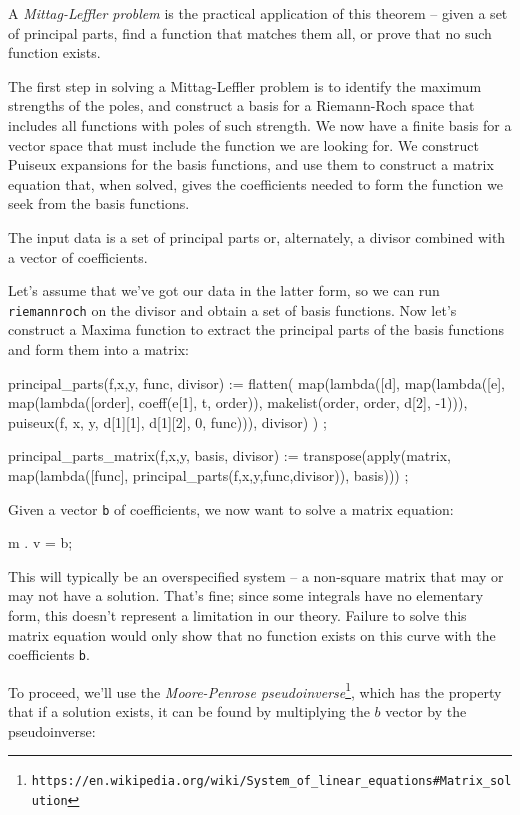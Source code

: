 A {\it Mittag-Leffler problem} is the practical application of this
theorem -- given a set of principal parts, find a function that
matches them all, or prove that no such function exists.

The first step in solving a Mittag-Leffler problem is to identify the
maximum strengths of the poles, and construct a basis for a
Riemann-Roch space that includes all functions with poles of such
strength.  We now have a finite basis for a vector space that must
include the function we are looking for.  We construct Puiseux
expansions for the basis functions, and use them to construct
a matrix equation that, when solved, gives the coefficients
needed to form the function we seek from the basis functions.

The input data is a set of principal parts or, alternately, a divisor
combined with a vector of coefficients.

Let's assume that we've got our data in the latter form, so we can run
{\tt riemannroch} on the divisor and obtain a set of basis functions.
Now let's construct a Maxima function to extract the principal parts
of the basis functions and form them into a matrix:

\begin{maximacommon}
principal_parts(f,x,y, func, divisor) :=
  flatten(
  map(lambda([d], map(lambda([e], map(lambda([order], coeff(e[1], t, order)), makelist(order, order, d[2], -1))),
                      puiseux(f, x, y, d[1][1], d[1][2], 0, func))), divisor)
  )
;

principal_parts_matrix(f,x,y, basis, divisor) :=
  transpose(apply(matrix, map(lambda([func], principal_parts(f,x,y,func,divisor)), basis)))
;
\end{maximacommon}

Given a vector {\tt b} of coefficients, we now want to
solve a matrix equation:

\begin{maximablock}
m . v = b;
\end{maximablock}

This will typically be an overspecified system -- a non-square matrix
that may or may not have a solution.  That's fine; since some
integrals have no elementary form, this doesn't represent a limitation
in our theory.  Failure to solve this matrix equation would only show
that no function exists on this curve with the coefficients {\tt b}.

To proceed, we'll use the
{\it Moore-Penrose pseudoinverse}\footnote{\tt https://en.wikipedia.org/wiki/System_of_linear_equations\#Matrix_solution},
which has the property that if a solution exists, it can
be found by multiplying the $b$ vector by the pseudoinverse:

